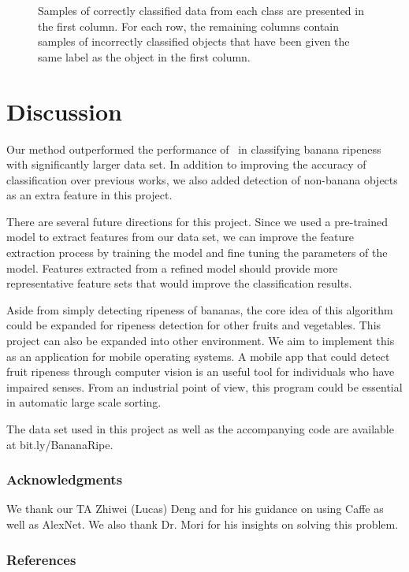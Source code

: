 \documentclass{article} %
\begin{document}
\begin{figure}[h]
\begin{subfigure}{.123\textwidth}
\captionsetup{labelformat=empty}
\caption{}
\end{subfigure}
\caption{Samples of correctly classified data from each class are presented in the first column. For each row, the remaining columns contain samples of incorrectly classified objects that have been given the same label as the object in the first column. }
\label{fig:correctVsIncorrect}
\end{figure}
\section{Discussion}
\label{sec:conclusion}

Our method outperformed  the performance of~\citet{saad2009recognizing} in classifying banana ripeness with significantly larger data set. In addition to improving the accuracy of classification over previous works, we also added detection of non-banana objects as an extra feature in this project. 

There are several future directions for this project. Since we used a pre-trained model to extract features from our data set, we can improve the feature extraction process by training the model and fine tuning the parameters of the model. Features extracted from a refined model should provide more representative feature sets that would improve the classification results.

Aside from simply detecting ripeness of bananas, the core idea of this algorithm could be expanded for ripeness detection for other fruits and vegetables. This project can also be expanded into other environment. We aim to implement this as an application for mobile operating systems. A mobile app that could detect fruit ripeness through computer vision is an useful tool for individuals who have impaired senses. From an industrial point of view, this program could be essential in automatic large scale sorting.

The data set used in this project as well as the accompanying code are available at bit.ly/BananaRipe.

\subsubsection*{Acknowledgments}
We thank our TA Zhiwei (Lucas) Deng and for his guidance on using Caffe as well as AlexNet. We also thank Dr. Mori for his insights on solving this problem. 
 
\renewcommand\refname{\vskip -.75cm}
\subsubsection*{References}

   		    
   
\end{document}
